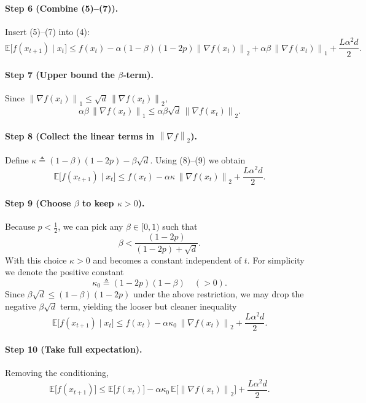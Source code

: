 \documentclass[11pt]{article}
\newcommand{\EE}{\mathbb{E}}
\newcommand{\norm}[1]{\left\lVert#1\right\rVert}
\begin{document}
\paragraph{Step 6 (Combine (5)–(7)).}
Insert (5)–(7) into (4):
\[
\EE\big[f(x_{t+1})\mid x_{t}\big]
\le f(x_{t})-\alpha(1-\beta)(1-2p)\norm{\nabla f(x_{t})}_{2}
    +\alpha\beta\,\norm{\nabla f(x_{t})}_{1}
    +\frac{L\alpha^{2}d}{2}.
\tag{8}
\]

\paragraph{Step 7 (Upper bound the $\beta$‑term).}
Since $\norm{\nabla f(x_{t})}_{1}\le \sqrt{d}\,\norm{\nabla f(x_{t})}_{2}$,
\[
\alpha\beta\,\norm{\nabla f(x_{t})}_{1}
\le \alpha\beta\sqrt{d}\,\norm{\nabla f(x_{t})}_{2}.
\tag{9}
\]

\paragraph{Step 8 (Collect the linear terms in $\norm{\nabla f}_{2}$).}
Define $\kappa\triangleq (1-\beta)(1-2p)-\beta\sqrt{d}$.
Using (8)–(9) we obtain
\[
\EE\big[f(x_{t+1})\mid x_{t}\big]
\le f(x_{t})-\alpha\kappa\,\norm{\nabla f(x_{t})}_{2}
    +\frac{L\alpha^{2}d}{2}.
\tag{10}
\]

\paragraph{Step 9 (Choose $\beta$ to keep $\kappa>0$).}
Because $p<\frac12$, we can pick any $\beta\in[0,1)$ such that
\[
\beta < \frac{(1-2p)}{(1-2p)+\sqrt{d}}.
\]
With this choice $\kappa>0$ and becomes a constant independent of $t$.
For simplicity we denote the positive constant
\[
\kappa_{0}\triangleq (1-2p)(1-\beta) \quad (>0).
\tag{11}
\]
Since $\beta\sqrt{d}\le (1-\beta)(1-2p)$ under the above restriction,
we may drop the negative $\beta\sqrt{d}$ term, yielding the looser but cleaner inequality
\[
\EE\big[f(x_{t+1})\mid x_{t}\big]
\le f(x_{t})-\alpha\kappa_{0}\,\norm{\nabla f(x_{t})}_{2}
    +\frac{L\alpha^{2}d}{2}.
\tag{12}
\]

\paragraph{Step 10 (Take full expectation).}
Removing the conditioning,
\[
\EE\big[f(x_{t+1})\big]
\le \EE\big[f(x_{t})\big]-\alpha\kappa_{0}\,\EE\!\big[\norm{\nabla f(x_{t})}_{2}\big]
    +\frac{L\alpha^{2}d}{2}.
\tag{13}
\]
\end{document}
